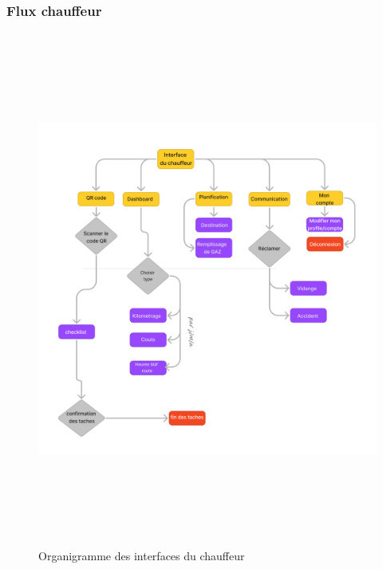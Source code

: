 \subsubsection{Flux chauffeur}
\begin{figure}[htbp]
  \centering
  \includegraphics[width=1\textwidth,height=17cm]{chap2.images/org chauffeur.png}
  \caption{Organigramme des interfaces du chauffeur}
\end{figure}

\newpage
